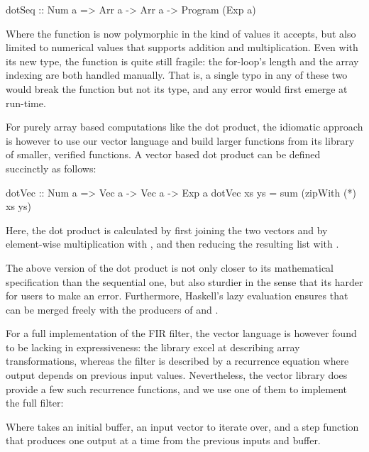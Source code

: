 \documentclass[../main.tex]{subfiles}
\begin{document}
\begin{code}
dotSeq :: Num a => Arr a -> Arr a -> Program (Exp a)
\end{code}

\noindent Where the function is now polymorphic in the kind of values it accepts, but also limited to numerical values that supports addition and multiplication. Even with its new type, the function is quite still fragile: the for-loop's length and the array indexing are both handled manually. That is, a single typo in any of these two would break the function but not its type, and any error would first emerge at run-time.

For purely array based computations like the dot product, the idiomatic approach is however to use our vector language and build larger functions from its library of smaller, verified functions. A vector based dot product can be defined succinctly as follows:

\begin{code}
dotVec :: Num a => Vec a -> Vec a -> Exp a
dotVec xs ys = sum (zipWith (*) xs ys)
\end{code}

\noindent Here, the dot product is calculated by first joining the two vectors  and  by element-wise multiplication with , and then reducing the resulting list with .

The above version of the dot product is not only closer to its mathematical specification than the sequential one, but also sturdier in the sense that its harder for users to make an error. Furthermore, Haskell's lazy evaluation ensures that  can be merged freely with the producers of  and .

For a full implementation of the FIR filter, the vector language is however found to be lacking in expressiveness: the library excel at describing array transformations, whereas the filter is described by a recurrence equation where output depends on previous input values. Nevertheless, the vector library does provide a few such recurrence functions, and we use one of them to implement the full filter:


\noindent Where  takes an initial buffer, an input vector to iterate over, and a step function that produces one output at a time from the previous inputs and buffer.
\end{document}
